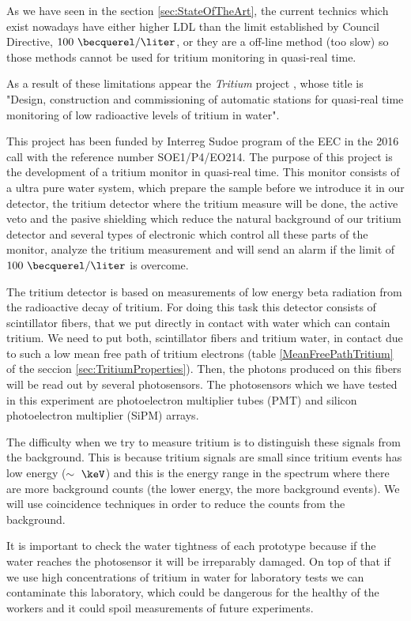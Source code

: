 As we have seen in the section \ref{sec:StateOfTheArt}, the current technics which exist nowadays have either higher LDL than the limit established by Council Directive, $100~\becquerel/\liter$, or they are a off-line method (too slow) so those methods cannot be used for tritium monitoring in quasi-real time. 

As a result of these limitations appear the \textit{Tritium} project \cite{TRITIUM}, whose title is "Design, construction and commissioning of automatic stations for quasi-real time monitoring of low radioactive levels of tritium in water".

This project has been funded by Interreg Sudoe program of the EEC in the 2016 call with the reference number SOE1/P4/EO214. The purpose of this project is the development of a tritium monitor in quasi-real time. This monitor consists of a ultra pure water system, which prepare the sample before we introduce it in our detector, the tritium detector where the tritium measure will be done, the active veto and the pasive shielding which reduce the natural background of our tritium detector and several types of electronic which control all these parts of the monitor, analyze the tritium measurement and will send an alarm if the limit of $100~\becquerel/\liter$ is overcome.

The tritium detector is based on measurements of low energy beta radiation from the radioactive decay of tritium. For doing this task this detector consists of scintillator fibers, that we put directly in contact with water which can contain tritium. We need to put both, scintillator fibers and tritium water, in contact due to such a low mean free path of tritium electrons (table \ref{MeanFreePathTritium} of the seccion \ref{sec:TritiumProperties}). Then, the photons produced on this fibers will be read out by several photosensors. The photosensors which we have tested in this experiment are photoelectron multiplier tubes (PMT) and silicon photoelectron multiplier (SiPM) arrays. 

The difficulty when we try to measure tritium is to distinguish these signals from the background. This is because tritium signals are small since tritium events has low energy ($\sim~\keV$) and this is the energy range in the spectrum where there are more background counts (the lower energy, the more background events). We will use coincidence techniques in order to reduce the counts from the background.

It is important to check the water tightness of each prototype because if the water reaches the photosensor it will be irreparably damaged. On top of that if we use high concentrations of tritium in water for laboratory tests we can contaminate this laboratory, which could be dangerous for the healthy of the workers and it could spoil measurements of future experiments.

